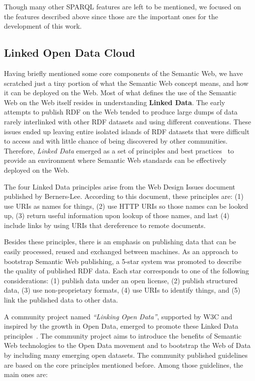 Though many other SPARQL features are left to be mentioned, we focused on the features described 
above since those are the important ones for the development of this work.

\subsection{Linked Open Data Cloud}
\label{cap2:semWeb/linkedData}
Having briefly mentioned some core components of the Semantic Web, we have scratched just a tiny 
portion of what the Semantic Web concept means, and how it can be deployed on the Web. Most of 
what defines the use of the Semantic Web on the Web itself resides in understanding 
\textbf{Linked Data}. The early attempts to publish RDF on the Web tended to produce large dumps 
of data rarely interlinked with other RDF datasets and using different conventions. These issues 
ended up leaving entire isolated islands of RDF datasets that were difficult to access and with 
little chance of being discovered by other communities. Therefore, \textit{Linked Data} emerged as 
a set of principles and best practices~\cite{key:ldprinciples} to provide an environment where 
Semantic Web standards can be effectively deployed on the Web.

The four Linked Data principles arise from the Web Design Issues document published by 
Berners-Lee\cite{key:ldprinciples}. According to this document, these principles are: (1) use URIs 
as names for things, (2) use HTTP URIs so those names can be looked up, (3) return useful 
information upon lookup of those names, and last (4) include links by using URIs that dereference 
to remote documents. 

Besides these principles, there is an emphasis on publishing data that can be easily processed, 
reused and exchanged between machines. As an approach to bootstrap Semantic Web publishing, 
a 5-star system\cite{key:ldprinciples} was promoted to describe the quality of published RDF data. 
Each star corresponds to one of the following considerations: (1) publish data under an open license, 
(2) publish structured data, (3) use non-proprietary formats, (4) use URIs to identify things, and 
(5) link the published data to other data.

A community project named \textit{“Linking Open Data”}, supported by W3C and inspired by the growth 
in Open Data, emerged to promote these Linked Data principles~\cite{key:ldbook}. The community 
project aims to introduce the benefits of Semantic Web technologies to the Open Data movement and 
to bootstrap the Web of Data by including many emerging open datasets. The community published 
guidelines are based on the core principles mentioned before. Among those guidelines, the main 
ones are:

